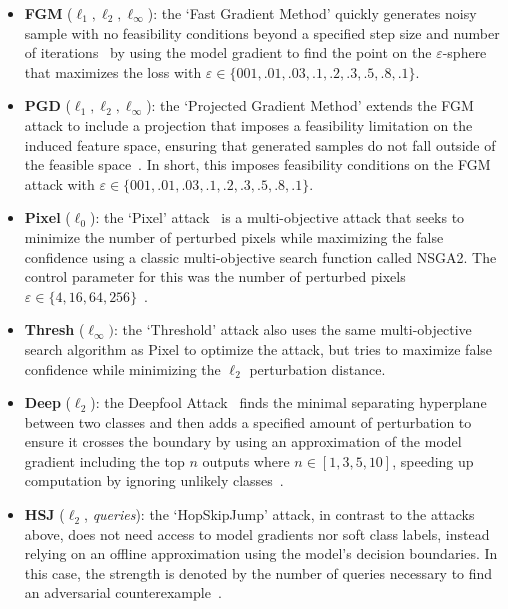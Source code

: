 \begin{itemize}
    \item \textbf{FGM} ($\ell_1, \ell_2, \ell_{\infty}$): the `Fast Gradient Method' quickly generates noisy sample with no feasibility conditions beyond a specified step size and number of iterations~\citep{fgm} by using the model gradient to find the point on the $\varepsilon$-sphere that maximizes the loss with $\varepsilon \in \{001,.01,.03,.1,.2,.3,.5,.8,.1\}$.
    \item \textbf{PGD}  ($\ell_1, \ell_2, \ell_{\infty}$):  the `Projected Gradient Method' extends the FGM attack to include a projection that imposes a feasibility limitation on the induced feature space, ensuring that generated samples do not fall outside of the feasible space~\citep{madry2017towards}. In short, this imposes feasibility conditions on the FGM attack with $\varepsilon \in \{001,.01,.03,.1,.2,.3,.5,.8,.1\}$.
    \item \textbf{Pixel} ($\ell_0$): the `Pixel' attack~\citep{pixelattack} is a multi-objective attack that seeks to minimize the number of perturbed pixels  while maximizing the false confidence using a classic multi-objective search function called NSGA2\citep{nsga2}. The control parameter for this was the number of perturbed pixels $\varepsilon \in \{4, 16, 64, 256\}$~.
    \item \textbf{Thresh} ($\ell_{\infty})$: the `Threshold' attack also uses the same multi-objective search algorithm as Pixel to optimize the attack, but tries to maximize false confidence while minimizing the $\ell_2$ perturbation distance.
    \item \textbf{Deep} ($\ell_2$): the Deepfool Attack~\citep{deepfool} finds the minimal separating hyperplane between two classes and then adds a specified amount of perturbation to ensure it crosses the boundary by using an approximation of the model gradient including the top $n$ outputs where $n \in [1,3,5,10]$, speeding up computation by ignoring unlikely classes~\citep{deepfool}.
    \item \textbf{HSJ} ($\ell_2$, \textit{queries}): the `HopSkipJump' attack, in contrast to the attacks above, does not need access to model gradients nor soft class labels, instead relying on an offline approximation using the model's decision boundaries. In this case, the strength is denoted by the number of queries necessary to find an adversarial counterexample~\citep{hopskipjump}.

\end{itemize}
